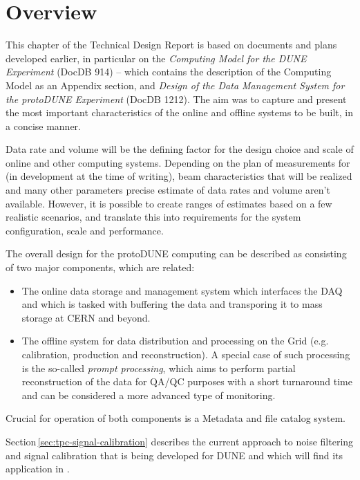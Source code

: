 \section{Overview}

This chapter of the Technical Design Report is based on documents and plans developed earlier, in particular
on the \textit{Computing Model for the DUNE Experiment} (DocDB 914) -- which contains the description
of the \pd Computing Model as an Appendix section, and \textit{Design of the Data Management System for the protoDUNE Experiment}
(DocDB 1212). The aim was to capture and present the most important characteristics of the online and offline systems to be built, in a concise manner.

Data rate and volume will be the defining factor for the design choice and scale of \pd online and other computing systems.
Depending on the plan of measurements for \pd
(in development at the time of writing), beam characteristics that will be realized
and many other parameters precise estimate of data rates and volume aren't available. However, it is possible to create ranges
of estimates based on a few realistic scenarios, and translate this into requirements for the system configuration, scale and
performance.

The overall design for the protoDUNE computing can be described as consisting of two major components, which are related:
\begin{itemize}
\item The online data storage and management system which interfaces the DAQ and which is tasked with buffering
the data and transporing it to mass storage at CERN and beyond.
\item The offline system for data distribution and processing on the Grid (e.g. calibration, production and reconstruction). A special case
of such processing is the so-called \textit{prompt processing}, which aims to perform partial reconstruction of the data for QA/QC purposes
with a short turnaround time and can be considered a more advanced type of monitoring.
\end{itemize}

\noindent Crucial for operation of both components is a Metadata and file catalog system.

Section\,\ref{sec:tpc-signal-calibration} describes the current approach to noise filtering and signal calibration that is being
developed for DUNE and which will find its application in \pd.


